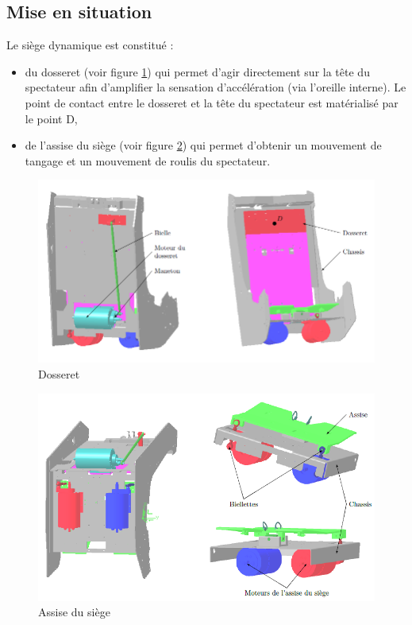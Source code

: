 \subsection{Mise en situation}

Le siège dynamique est constitué :
\begin{itemize}
 \item du dosseret (voir figure \ref{fig2}) qui permet d'agir directement sur la tête du spectateur afin d'amplifier la sensation d'accélération (via l'oreille interne). Le point de contact entre le dosseret et la tête du spectateur est matérialisé par le point D,
 \item de l'assise du siège (voir figure \ref{fig3}) qui permet d'obtenir un mouvement de tangage et un mouvement de roulis du spectateur.
\end{itemize}

\begin{figure}[!ht]
\begin{center}
 \includegraphics[width=0.8\linewidth]{img/img02}
\end{center}
\caption{Dosseret}
\label{fig2}
\end{figure}

\begin{figure}[!ht]
\begin{center}
 \includegraphics[width=0.8\linewidth]{img/img03}
\end{center}
\caption{Assise du siège}
\label{fig3}
\end{figure}

